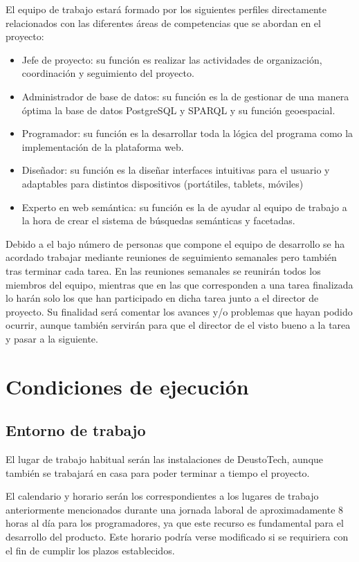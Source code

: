 El equipo de trabajo estará formado por los siguientes perfiles directamente relacionados con las diferentes áreas de competencias que se abordan en el proyecto: 

\begin{itemize}
	\item Jefe de proyecto: su función es realizar las actividades de organización, coordinación y seguimiento del proyecto.
	\item Administrador de base de datos: su función es la de gestionar de una manera óptima la base de datos PostgreSQL y SPARQL y su función geoespacial. 
	\item Programador: su función es la desarrollar toda la lógica del programa como la implementación de la plataforma web. 
	\item Diseñador: su función es la diseñar interfaces intuitivas para el usuario y adaptables para distintos dispositivos (portátiles, tablets, móviles) 
	\item Experto en web semántica: su función es la de ayudar al equipo de trabajo a la hora de crear el sistema de búsquedas semánticas y facetadas. 
\end{itemize}

Debido a el bajo número de personas que compone el equipo de desarrollo se ha acordado trabajar mediante reuniones de seguimiento semanales pero también tras terminar cada tarea. En las reuniones semanales se reunirán todos los miembros del equipo, mientras que en las que corresponden a una tarea finalizada lo harán solo los que han participado en dicha tarea junto a el director de proyecto. Su finalidad será comentar los avances y/o problemas que hayan podido ocurrir, aunque también servirán para que el director de el visto bueno a la tarea y pasar a la siguiente. 

\chapter{Condiciones de ejecución}

\section{Entorno de trabajo}

El lugar de trabajo habitual serán las instalaciones de DeustoTech, aunque también se trabajará en casa para poder terminar a tiempo el proyecto.

El calendario y horario serán los correspondientes a los lugares de trabajo anteriormente mencionados durante una jornada laboral de aproximadamente 8 horas al día para los programadores, ya que este recurso es fundamental para el desarrollo del producto. Este horario podría verse modificado si se requiriera con el fin de cumplir los plazos establecidos.

